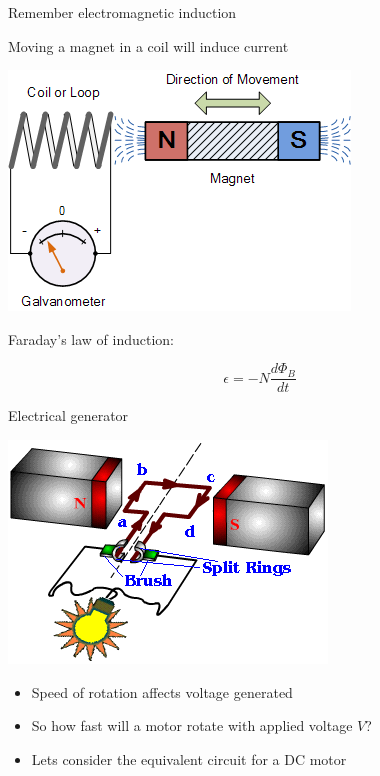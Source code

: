 \documentclass[compress]{beamer}
\begin{document}
\begin{frame}{Remember electromagnetic induction}

  Moving a magnet in a coil will induce current


    \begin{center}
        \includegraphics[width=0.6\linewidth]{image29}
    \end{center}

Faraday's law of induction:
    
\[
\epsilon = - N \frac{d\Phi_B}{dt}
\]

\end{frame}

\begin{frame}{Electrical generator}

    \begin{center}
        \includegraphics[width=0.6\linewidth]{image30}
    \end{center}

\begin{itemize}

\item Speed of rotation affects voltage generated
\item So how fast will a motor rotate with applied voltage $V$?
\item Lets consider the equivalent circuit for a DC motor
\end{itemize}
\end{frame}
\end{document}
